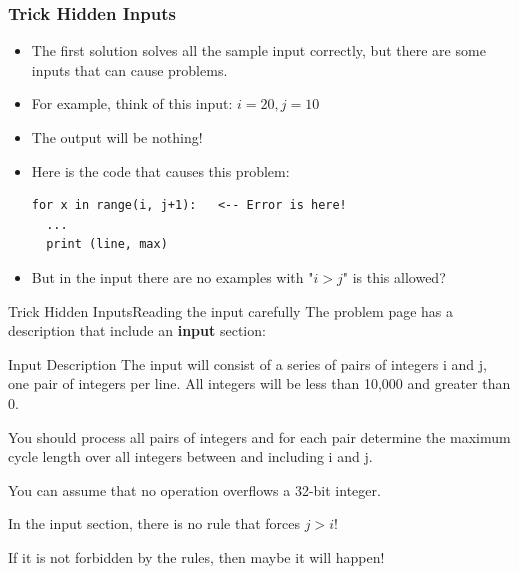 \begin{frame}[fragile]
  \frametitle{Trick Hidden Inputs}

  \begin{itemize}
    \item The first solution solves all the sample input correctly, but
    there are some inputs that can cause problems.
    \bigskip

    \item For example, think of this input: \alert{$i = 20, j = 10$}
    \item The output will be nothing!
    \bigskip

    \item Here is the code that causes this problem:
\begin{verbatim}
for x in range(i, j+1):   <-- Error is here!
  ...
  print (line, max)
\end{verbatim}
    \bigskip

    \item But in the input there are no examples with "$i > j$" is this
    allowed?
  \end{itemize}
\end{frame}

\begin{frame}{Trick Hidden Inputs}{Reading the input carefully}
  The problem page has a description that include an {\bf input} section:

  \begin{block}{Input Description}
    The input will consist of a series of \alert{pairs of integers} i and j, one pair of integers per line. All integers will be \alert{less than 10,000 and greater than 0.}

    \bigskip

    You should process all pairs of integers and for each pair determine the maximum cycle length over \alert{all integers between and including i and j}.
    \bigskip

    You can \alert{assume that no operation overflows a 32-bit integer}.
  \end{block}
  \bigskip

  In the input section, there is no rule that forces $j > i$!
  \medskip

  If it is not forbidden by the rules, then maybe it will happen!
\end{frame}

